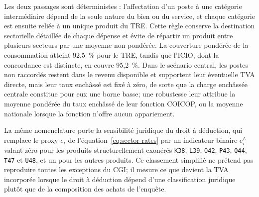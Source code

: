 \documentclass[11pt,a4paper]{article}
\begin{document}
Les deux passages sont déterministes : l'affectation d'un poste à une catégorie
intermédiaire dépend de la seule nature du bien ou du service, et chaque
catégorie est ensuite reliée à un unique produit du TRE. Cette règle conserve la
destination sectorielle détaillée de chaque dépense et évite de répartir un
produit entre plusieurs secteurs par une moyenne non pondérée. La couverture
pondérée de la consommation atteint 92,5~\% pour le TRE, tandis que l'ICIO, dont
la concordance est distincte, en couvre 95,2~\%. Dans le scénario central, les
postes non raccordés restent dans le revenu disponible et supportent leur
éventuelle TVA directe, mais leur taux enchâssé est fixé à zéro, de sorte que la
charge enchâssée centrale constitue pour eux une borne basse; une robustesse
leur attribue la moyenne pondérée du taux enchâssé de leur fonction COICOP, ou
la moyenne nationale lorsque la fonction n'offre aucun appariement.

La même nomenclature porte la sensibilité juridique du droit à déduction, qui
remplace le proxy $e_i$ de l'équation~\eqref{eq:sector-rates} par un indicateur
binaire $e_i^{L}$ valant zéro pour les produits structurellement exonérés
\texttt{K38}, \texttt{L39}, \texttt{O42}, \texttt{P43}, \texttt{Q44},
\texttt{T47} et \texttt{U48}, et un pour les autres produits. Ce classement
simplifié ne prétend pas reproduire toutes les exceptions du CGI; il mesure ce
que devient la TVA incorporée lorsque le droit à déduction dépend d'une
classification juridique plutôt que de la composition des achats de l'enquête.
\end{document}
